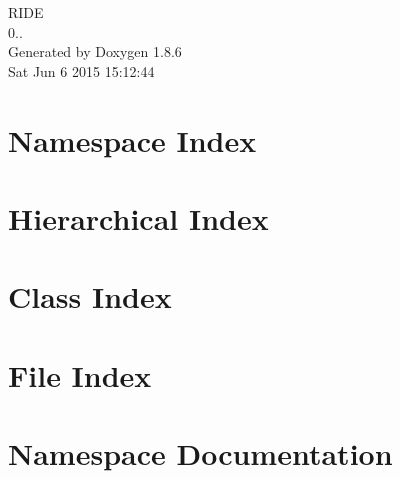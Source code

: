 \documentclass[twoside]{book}
\newcommand{\clearemptydoublepage}{%
  \newpage{\pagestyle{empty}\cleardoublepage}%
}
\begin{document}
\hypersetup{pageanchor=false}
\begin{titlepage}
\vspace*{7cm}
\begin{center}%
{\Large R\-I\-D\-E \\[1ex]\large 0.. }\\
\vspace*{1cm}
{\large Generated by Doxygen 1.8.6}\\
\vspace*{0.5cm}
{\small Sat Jun 6 2015 15:12:44}\\
\end{center}
\end{titlepage}
\clearemptydoublepage
\tableofcontents
\clearemptydoublepage
{}
\hypersetup{pageanchor=true}

\chapter{Namespace Index}

\chapter{Hierarchical Index}

\chapter{Class Index}

\chapter{File Index}

\chapter{Namespace Documentation}







\end{document}
